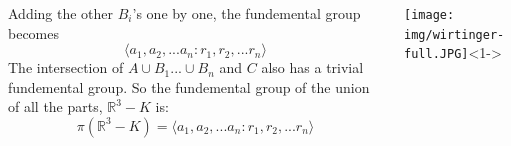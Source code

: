 \documentclass[8pt]{beamer}
\begin{document}
\begin{frame}
\begin{columns}
\begin{column}[T]{0.5\textwidth}
\begin{itemize}
            Adding the other $B_i$'s one by one, the fundemental group becomes
            \[\langle a_1, a_2, ... a_n : r_1, r_2, ... r_n\rangle \]
            The intersection of $A \cup B_1 ... \cup B_n$ and $C$ also has a
            trivial fundemental group. So the fundemental group of the union of
            all the parts, $\mathbb{R}^3- K$ is:
            \[\pi(\mathbb{R}^3-K) = \langle a_1, a_2, ... a_n : r_1, r_2, ... r_n\rangle \]

        \end{itemize}
      \end{column}
      \begin{column}[T]{0.5\textwidth}
        \begin{center}
        \texttt{[image: img/wirtinger-full.JPG]}<1->
        \end{center}
      \end{column}
    \end{columns}
  \end{frame}
\end{document}
